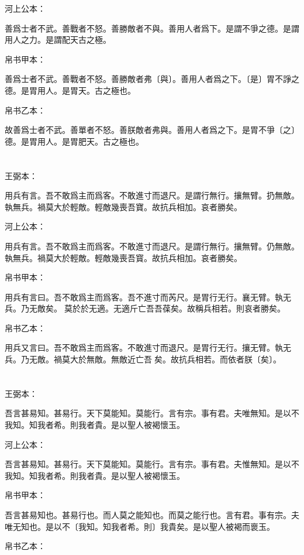 \documentclass[a5paper]{ctexbook}
\begin{document}
    河上公本：

    善爲士者不武。善戰者不怒。善勝敵者不與。善用人者爲下。是謂不爭之德。是謂用人之力。是謂配天古之極。

    帛书甲本：

    善爲士者不武。善戰者不怒。善勝敵者弗〔與〕。善用人者爲之下。〔是〕胃不諍之德。是胃用人。是胃天。古之極也。

    帛书乙本：

    故善爲士者不武。善單者不怒。善朕敵者弗與。善用人者爲之下。是胃不爭〔之〕德。是胃用人。是胃肥天。古之極也。

    \chapter{}
    王弼本：

    用兵有言。吾不敢爲主而爲客。不敢進寸而退尺。是謂行無行。攘無臂。扔無敵。執無兵。禍莫大於輕敵。輕敵幾喪吾寶。故抗兵相加。哀者勝矣。

    河上公本：

    用兵有言。吾不敢爲主而爲客。不敢進寸而退尺。是謂行無行。攘無臂。仍無敵。執無兵。禍莫大於輕敵。輕敵幾喪吾寳。故抗兵相加。哀者勝矣。

    帛书甲本：

    用兵有言曰。吾不敢爲主而爲客。吾不進寸而芮尺。是胃行无行。襄无臂。執无兵。乃无敵矣。𢢸莫於於无適。无適斤亡吾吾葆矣。故稱兵相若。則哀者勝矣。

    帛书乙本：

    用兵又言曰。吾不敢爲主而爲客。不敢進寸而退尺。是胃行无行。攘无臂。執无兵。乃无敵。禍莫大於無敵。無敵近亡吾𤥯矣。故抗兵相若。而依者朕〔矣〕。

    \chapter{}
    王弼本：

    吾言甚易知。甚易行。天下莫能知。莫能行。言有宗。事有君。夫唯無知。是以不我知。知我者希。則我者貴。是以聖人被褐懷玉。

    河上公本：

    吾言甚易知。甚易行。天下莫能知。莫能行。言有宗。事有君。夫惟無知。是以不我知。知我者希。則我者貴。是以聖人被褐懷玉。

    帛书甲本：

    吾言甚易知也。甚易行也。而人莫之能知也。而莫之能行也。言有君。事有宗。夫唯无知也。是以不〔我知。知我者希。則〕我貴矣。是以聖人被褐而褱玉。

    帛书乙本：
\end{document}
